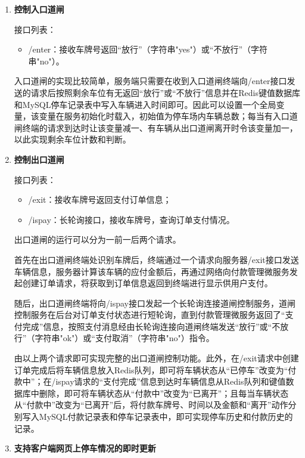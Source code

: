 \documentclass[a4paper]{ctexart}
\begin{document}
\begin{enumerate}[label=\bf{\arabic*、}]
	\item {\bf 控制入口道闸}

	接口列表：

	\begin{itemize}
		\item /enter：接收车牌号返回“放行”（字符串"yes"）或“不放行”（字符串"no"）。
	\end{itemize}

	入口道闸的实现比较简单，服务端只需要在收到入口道闸终端向/enter接口发送的请求后按照剩余车位有无返回“放行”或“不放行”信息并在Redis键值数据库和MySQL停车记录表中写入车辆进入时间即可。因此可以设置一个全局变量，该变量在服务初始化时载入，初始值为停车场内车辆总数；每当有入口道闸终端的请求到达时让该变量减一、有车辆从出口道闸离开时令该变量加一，以此实现剩余车位计数和判断。

	\item {\bf 控制出口道闸}

	接口列表：

	\begin{itemize}
		\item /exit：接收车牌号返回支付订单信息；
		\item /ispay：长轮询接口，接收车牌号，查询订单支付情况。
	\end{itemize}
	
	出口道闸的运行可以分为一前一后两个请求。
	
	首先在出口道闸终端处识别车牌后，终端通过一个请求向服务器/exit接口发送车辆信息，服务器计算该车辆的应付金额后，再通过网络向付款管理微服务发起创建订单请求，将获取到订单信息返回到终端进行显示供用户支付。

	随后，出口道闸终端将向/ispay接口发起一个长轮询连接道闸控制服务，道闸控制服务在后台对订单支付状态进行短轮询，直到付款管理微服务返回了“支付完成”信息，按照支付消息经由长轮询连接向道闸终端发送“放行”或“不放行”（字符串"ok"）或“支付取消”（字符串"no"）指令。

	由以上两个请求即可实现完整的出口道闸控制功能。此外，在/exit请求中创建订单完成后将车辆信息放入Redis队列，即可将车辆状态从“已停车”改变为“付款中”；在/ispay请求的“支付完成”信息到达时车辆信息从Redis队列和键值数据库中删除，即可将车辆状态从“付款中”改变为“已离开”；且每当车辆状态从“付款中”改变为“已离开”后，将付款车牌号、时间以及金额和“离开”动作分别写入MySQL付款记录表和停车记录表中，即可实现停车历史和付款历史的记录。

	\item {\bf 支持客户端网页上停车情况的即时更新}
	

\end{enumerate}
\end{document}
